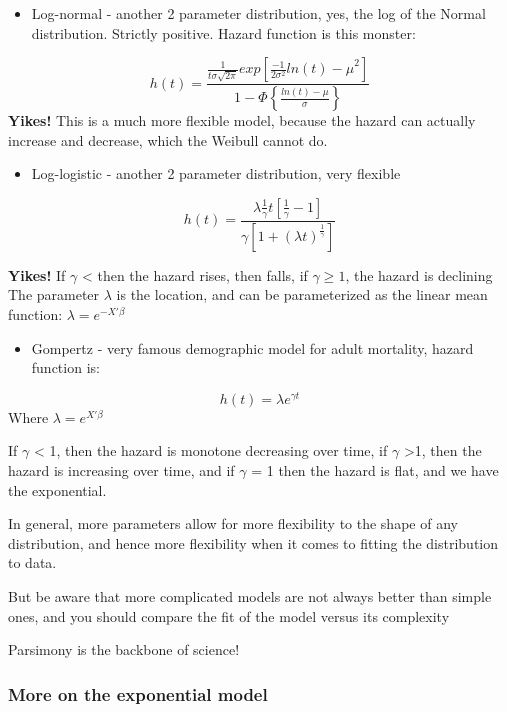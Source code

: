 \documentclass[
]{article}
\providecommand{\tightlist}{%
  \setlength{\itemsep}{0pt}\setlength{\parskip}{0pt}}
\begin{document}
\begin{itemize}
\tightlist
\item
  Log-normal - another 2 parameter distribution, yes, the log of the
  Normal distribution. Strictly positive. Hazard function is this
  monster:
\end{itemize}

\[h(t) = \frac{\frac{1}{t\sigma \sqrt{2\pi}}exp \left [ \frac{-1}{2\sigma^2} {ln(t)-\mu}^2 \right]} {1-\Phi \left \{ \frac{ln(t)- \mu}{\sigma} \right \}} \]
\textbf{Yikes!} This is a much more flexible model, because the hazard
can actually increase and decrease, which the Weibull cannot do.

\begin{itemize}
\tightlist
\item
  Log-logistic - another 2 parameter distribution, very flexible
\end{itemize}

\[h(t) = \frac{\lambda \frac{1}{\gamma} t [ \frac{1}{\gamma} -1 ] }
{\gamma  [ 1+(\lambda t)^{\frac{1}{\gamma}} ]}\]

\textbf{Yikes!} If \(\gamma\) \textless{} then the hazard rises, then
falls, if \(\gamma \geqslant 1\), the hazard is declining The parameter
\(\lambda\) is the location, and can be parameterized as the linear mean
function: \(\lambda = e^{-{X'\beta}}\)

\begin{itemize}
\tightlist
\item
  Gompertz - very famous demographic model for adult mortality, hazard
  function is:
\end{itemize}

\[h(t) = \lambda e^{\gamma t} \] Where \(\lambda = e^{X'\beta}\)

If \(\gamma\) \textless{} 1, then the hazard is monotone decreasing over
time, if \(\gamma\) \textgreater1, then the hazard is increasing over
time, and if \(\gamma\) = 1 then the hazard is flat, and we have the
exponential.

In general, more parameters allow for more flexibility to the shape of
any distribution, and hence more flexibility when it comes to fitting
the distribution to data.

But be aware that more complicated models are not always better than
simple ones, and you should compare the fit of the model versus its
complexity

Parsimony is the backbone of science!

\hypertarget{more-on-the-exponential-model}{%
\subsubsection{More on the exponential
model}\label{more-on-the-exponential-model}}
\end{document}
